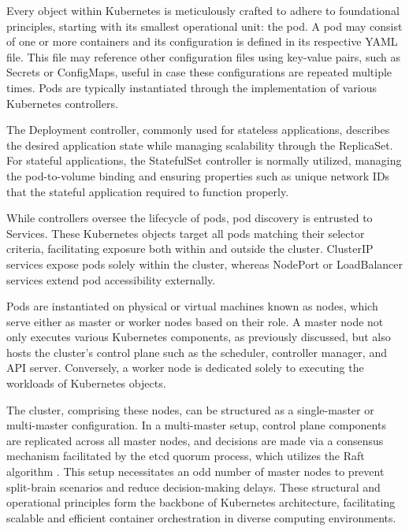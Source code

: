Every object within Kubernetes is meticulously crafted to adhere to foundational principles, starting with its smallest operational unit: the pod. A pod may consist of one or more containers and its configuration is defined in its respective YAML file. This file may reference other configuration files using key-value pairs, such as Secrets or ConfigMaps, useful in case these configurations are repeated multiple times. 
Pods are typically instantiated through the implementation of various Kubernetes controllers.

The Deployment controller, commonly used for stateless applications, describes the desired application state while managing scalability through the ReplicaSet. For stateful applications, the StatefulSet controller is normally utilized, managing the pod-to-volume binding and ensuring properties such as unique network IDs that the stateful application required to function properly.

While controllers oversee the lifecycle of pods, pod discovery is entrusted to Services. These Kubernetes objects target all pods matching their selector criteria, facilitating exposure both within and outside the cluster. ClusterIP services expose pods solely within the cluster, whereas NodePort or LoadBalancer services extend pod accessibility externally.

Pods are instantiated on physical or virtual machines known as nodes, which serve either as master or worker nodes based on their role. A master node not only executes various Kubernetes components, as previously discussed, but also hosts the cluster's control plane such as the scheduler, controller manager, and API server. Conversely, a worker node is dedicated solely to executing the workloads of Kubernetes objects.

The cluster, comprising these nodes, can be structured as a single-master or multi-master configuration. In a multi-master setup, control plane components are replicated across all master nodes, and decisions are made via a consensus mechanism facilitated by the etcd quorum process, which utilizes the Raft algorithm \cite{k1-1}. This setup necessitates an odd number of master nodes to prevent split-brain \cite{k1-2} scenarios and reduce decision-making delays. These structural and operational principles form the backbone of Kubernetes architecture, facilitating scalable and efficient container orchestration in diverse computing environments.

